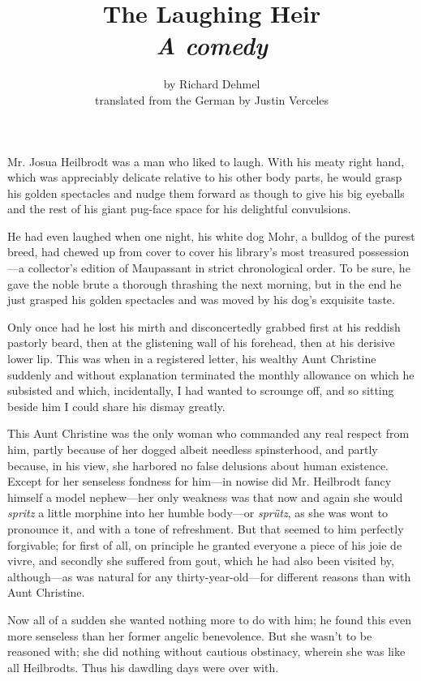 \documentclass[12pt,a4paper]{article}
\title{The Laughing Heir\\ \large{\textit{A comedy}}}
\author{by Richard Dehmel\\translated from the German by Justin Verceles}
\date{}
\begin{document}
\maketitle

Mr. Josua Heilbrodt was a man who liked to laugh. With his meaty right hand, which was appreciably delicate relative to his other body parts, he would grasp his golden spectacles and nudge them forward as though to give his big eyeballs and the rest of his giant pug-face space for his delightful convulsions.

He had even laughed when one night, his white dog Mohr, a bulldog of the purest breed, had chewed up from cover to cover his library’s most treasured possession—a collector’s edition of Maupassant in strict chronological order. To be sure, he gave the noble brute a thorough thrashing the next morning, but in the end he just grasped his golden spectacles and was moved by his dog’s exquisite taste.

Only once had he lost his mirth and disconcertedly grabbed first at his reddish pastorly beard, then at the glistening wall of his forehead, then at his derisive lower lip. This was when in a registered letter, his wealthy Aunt Christine suddenly and without explanation terminated the monthly allowance on which he subsisted and which, incidentally, I had wanted to scrounge off, and so sitting beside him I could share his dismay greatly.

This Aunt Christine was the only woman who commanded any real respect from him, partly because of her dogged albeit needless spinsterhood, and partly because, in his view, she harbored no false delusions about human existence. Except for her senseless fondness for him—in nowise did Mr. Heilbrodt fancy himself a model nephew—her only weakness was that now and again she would \textit{spritz} a little morphine into her humble body—or \textit{sprütz}, as she was wont to pronounce it, and with a tone of refreshment. But that seemed to him perfectly forgivable; for first of all, on principle he granted everyone a piece of his joie de vivre, and secondly she suffered from gout, which he had also been visited by, although—as was natural for any thirty-year-old—for different reasons than with Aunt Christine.

Now all of a sudden she wanted nothing more to do with him; he found this even more senseless than her former angelic benevolence. But she wasn’t to be reasoned with; she did nothing without cautious obstinacy, wherein she was like all Heilbrodts. Thus his dawdling days were over with.
\end{document}
